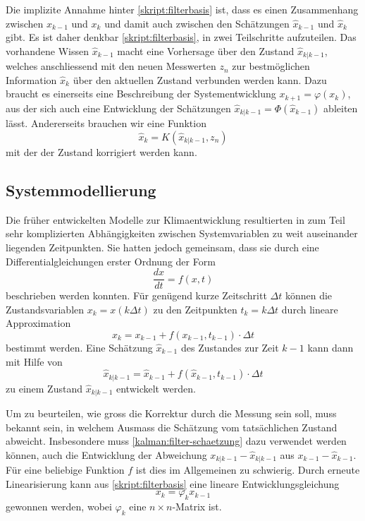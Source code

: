 Die implizite Annahme hinter \eqref{skript:filterbasis} ist,
dass es einen Zusammenhang zwischen $x_{k-1}$ und $x_k$ und damit auch
zwischen den Schätzungen $\hat{x}_{k-1}$ und $\hat{x}_k$ gibt.
Es ist daher denkbar \eqref{skript:filterbasis}, in zwei Teilschritte
aufzuteilen.
Das vorhandene Wissen $\hat{x}_{k-1}$ macht eine Vorhersage über den
Zustand $\hat{x}_{k|k-1}$, welches anschliessend mit den neuen 
Messwerten $z_n$ zur bestmöglichen Information $\hat{x}_k$ über den
aktuellen Zustand verbunden werden kann.
Dazu braucht es einerseits eine Beschreibung der Systementwicklung
$x_{k+1} = \varphi(x_k)$, aus der sich auch eine Entwicklung der
Schätzungen $\hat{x}_{k|k-1} = \Phi(\hat{x}_{k-1})$ ableiten lässt.
Andererseits brauchen wir eine Funktion
\begin{equation}
\hat{x}_k = K(\hat{x}_{k|k-1}, z_n)
\end{equation}
mit der der Zustand korrigiert werden kann.

\subsection{Systemmodellierung\label{subsection:systemmodellierung}}
Die früher entwickelten Modelle zur Klimaentwicklung resultierten in
zum Teil sehr komplizierten Abhängigkeiten zwischen Systemvariablen
zu weit auseinander liegenden Zeitpunkten.
Sie hatten jedoch gemeinsam, dass sie durch eine Differentialgleichungen
erster Ordnung der Form
\[
\frac{dx}{dt} = f(x,t)
\]
beschrieben werden konnten.
Für genügend kurze Zeitschritt $\Delta t$ können die Zustandsvariablen
$x_k = x(k\Delta t)$ zu den Zeitpunkten $t_k=k\Delta t$
durch lineare Approximation
\[
x_k = x_{k-1} + f(x_{k-1}, t_{k-1}) \cdot \Delta t
\]
bestimmt werden.
Eine Schätzung $\hat{x}_{k-1}$ des Zustandes zur Zeit $k-1$ 
kann dann mit Hilfe von
\begin{equation}
\hat{x}_{k|k-1} = \hat{x}_{k-1} + f(\hat{x}_{k-1},t_{k-1})\cdot \Delta t
\label{kalman:filter-schaetzung}
\end{equation}
zu einem Zustand $\hat{x}_{k|k-1}$ entwickelt werden.

Um zu beurteilen, wie gross die Korrektur durch die Messung sein soll,
muss bekannt sein, in welchem Ausmass die Schätzung vom tatsächlichen
Zustand abweicht.
Insbesondere muss \eqref{kalman:filter-schaetzung} dazu verwendet werden
können, auch die Entwicklung der Abweichung $x_{k|k-1}-\hat{x}_{k|k-1}$
aus $x_{k-1} - \hat{x}_{k-1}$.
Für eine beliebige Funktion $f$ ist dies im Allgemeinen zu schwierig.
Durch erneute Linearisierung kann aus
\eqref{skript:filterbasis} eine lineare Entwicklungsgleichung
\begin{equation}
x_k = \varphi_k x_{k-1}
\end{equation}
gewonnen werden, wobei $\varphi_k$ eine $n\times n$-Matrix ist.


